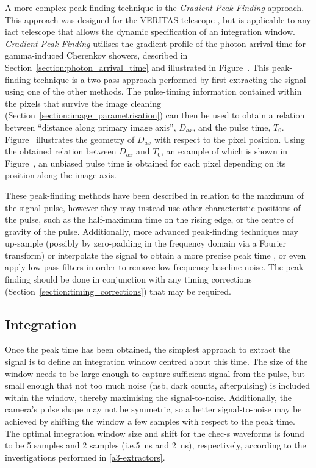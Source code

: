  A more complex peak-finding technique is the \textit{Gradient Peak Finding} approach. This approach was designed for the VERITAS telescope \cite{Holder2005}\cite{Cogan2006}\cite{Cogan2007}, but is applicable to any \gls{iact} telescope that allows the dynamic specification of an integration window. \textit{Gradient Peak Finding} utilises the gradient profile of the photon arrival time for gamma-induced Cherenkov showers, described in Section~\ref{section:photon_arrival_time} and illustrated in Figure~. This peak-finding technique is a two-pass approach performed by first extracting the signal using one of the other methods. The pulse-timing information contained within the pixels that survive the image cleaning (Section~\ref{section:image_parametrisation}) can then be used to obtain a relation between ``distance along primary image axis'', $D_{ax}$, and the pulse time, $T_0$. Figure~ illustrates the geometry of $D_{ax}$ with respect to the pixel position. Using the obtained relation between $D_{ax}$ and $T_0$, an example of which is shown in Figure~, an unbiased pulse time is obtained for each pixel depending on its position along the image axis.

These peak-finding methods have been described in relation to the maximum of the signal pulse, however they may instead use other characteristic positions of the pulse, such as the half-maximum time on the rising edge, or the centre of gravity of the pulse. Additionally, more advanced peak-finding techniques may up-sample (possibly by zero-padding in the frequency domain via a Fourier transform) or interpolate the signal to obtain a more precise peak time \cite{Cogan2006, Cogan2007}, or even apply low-pass filters in order to remove low frequency baseline noise. The peak finding should be done in conjunction with any timing corrections (Section~\ref{section:timing_corrections}) that may be required.

\subsection{Integration}

Once the peak time has been obtained, the simplest approach to extract the signal is to define an integration window centred about this time. The size of the window needs to be large enough to capture sufficient signal from the pulse, but small enough that not too much noise (\gls{nsb}, dark counts, afterpulsing) is included within the window, thereby maximising the signal-to-noise. Additionally, the camera's pulse shape may not be symmetric, so a better signal-to-noise may be achieved by shifting the window a few samples with respect to the peak time. The optimal integration window size and shift for the \gls{chec-s} waveforms is found to be 5 samples and 2 samples (i.e.\@ \SI{5}{ns} and \SI{2}{ns}), respectively, according to the investigations performed in \ref{a3-extractors}.

